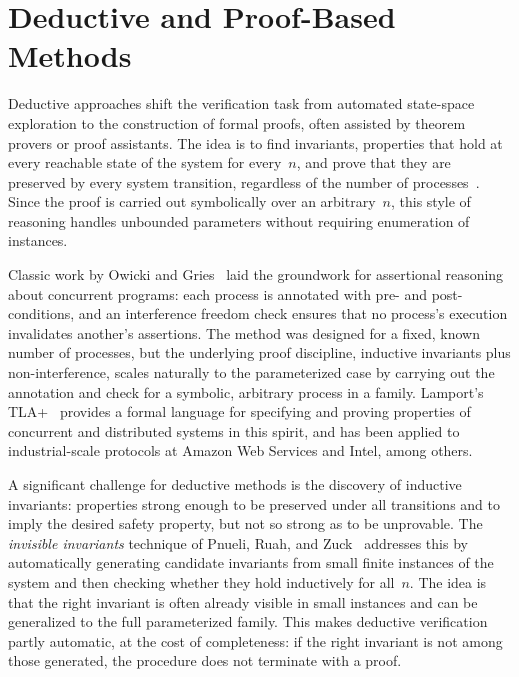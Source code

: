 \section{Deductive and Proof-Based Methods}

Deductive approaches shift the verification task from automated state-space
exploration to the construction of formal proofs, often assisted by theorem
provers or proof assistants. The idea is to find invariants, properties
that hold at every reachable state of the system for every~$n$, and prove
that they are preserved by every system transition, regardless of the number
of processes~\cite{OG76,Lam94}. Since the proof is carried out symbolically
over an arbitrary~$n$, this style of reasoning handles unbounded parameters
without requiring enumeration of instances.

Classic work by Owicki and Gries~\cite{OG76} laid the groundwork for
assertional reasoning about concurrent programs: each process is annotated
with pre- and post-conditions, and an interference freedom check ensures that
no process's execution invalidates another's assertions. The method was
designed for a fixed, known number of processes, but the underlying proof
discipline, inductive invariants plus non-interference, scales naturally
to the parameterized case by carrying out the annotation and check for a
symbolic, arbitrary process in a family. Lamport's TLA+~\cite{Lam94} provides
a formal language for specifying and proving properties of concurrent and
distributed systems in this spirit, and has been applied to industrial-scale
protocols at Amazon Web Services and Intel, among others.

A significant challenge for deductive methods is the discovery of inductive
invariants: properties strong enough to be preserved under all transitions and
to imply the desired safety property, but not so strong as to be unprovable.
The \emph{invisible invariants} technique of Pnueli, Ruah, and
Zuck~\cite{PRZ01} addresses this by automatically generating candidate
invariants from small finite instances of the system and then checking whether
they hold inductively for all~$n$. The idea is that the right invariant is
often already visible in small instances and can be generalized to the full
parameterized family. This makes deductive verification partly automatic, at
the cost of completeness: if the right invariant is not among those generated,
the procedure does not terminate with a proof.

